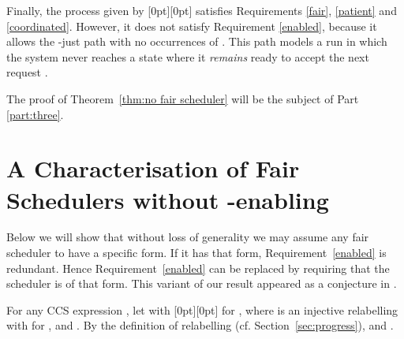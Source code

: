 \documentclass[smallcondensed]{svjour3}
\newcommand{\plat}[1]{\raisebox{0pt}[0pt][0pt]{#1}}  \def\precond#1{{\vphantom{#1}}^\bullet #1}
\newcommand{\Thm}[1]{Theorem~\ref{thm:#1}}
\newcommand{\Part}[1]{Part {\ref{part:#1}}}
\newcounter {part}
\begin{document}
Finally, the process  given by
\plat{}
satisfies Requirements \ref{fair}, \ref{patient} and \ref{coordinated}. However, it does not
satisfy Requirement \ref{enabled}, because it allows the -just path 
with no occurrences of . This path models a run in which the system never reaches a state where
it \emph{remains} ready to accept the next request .

The proof of \Thm{no fair scheduler} will be the subject of
\Part{three}.

\section[A Characterisation of Fair Schedulers without enabling]{A Characterisation of Fair Schedulers without -enabling}\label{sec:characterisation}


Below we will show that without loss of generality we may assume
any fair scheduler to have a specific form. If it has that form,
Requirement~\ref{enabled} is redundant. Hence Requirement~\ref{enabled} can be replaced by
requiring that the scheduler is of that form.
This variant of our result appeared as a conjecture in \cite{GH14}.

For any CCS expression , let 
with \plat{} for ,
where  is an injective relabelling with  for , and
.
By the definition of relabelling (cf. Section~\ref{sec:progress}),  and .
\end{document}
